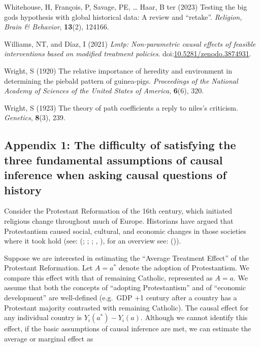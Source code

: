 \documentclass[
  singlecolumn,
  9pt]{article}
\begin{document}
\begin{CSLReferences}
Whitehouse, H, François, P, Savage, PE, \ldots{} Haar, B ter (2023)
Testing the big gods hypothesis with global historical data: A review
and {``}retake{''}. \emph{Religion, Brain \& Behavior}, \textbf{13}(2),
124166.

Williams, NT, and Díaz, I (2021) \emph{Lmtp: Non-parametric causal
effects of feasible interventions based on modified treatment policies}.
doi:\href{https://doi.org/10.5281/zenodo.3874931}{10.5281/zenodo.3874931}.

Wright, S (1920) The relative importance of heredity and environment in
determining the piebald pattern of guinea-pigs. \emph{Proceedings of the
National Academy of Sciences of the United States of America},
\textbf{6}(6), 320.

Wright, S (1923) The theory of path coefficients a reply to niles's
criticism. \emph{Genetics}, \textbf{8}(3), 239.

\end{CSLReferences}

\newpage{}

\subsection{Appendix 1: The difficulty of satisfying the three
fundamental assumptions of causal inference when asking causal questions
of
history}\label{appendix-1-the-difficulty-of-satisfying-the-three-fundamental-assumptions-of-causal-inference-when-asking-causal-questions-of-history}

Consider the Protestant Reformation of the 16th century, which initiated
religious change throughout much of Europe. Historians have argued that
Protestantism caused social, cultural, and economic changes in those
societies where it took hold (see: (; ;
; , ), for an overview see:
()).

Suppose we are interested in estimating the ``Average Treatment Effect''
of the Protestant Reformation. Let \(A = a^*\) denote the adoption of
Protestantism. We compare this effect with that of remaining Catholic,
represented as \(A = a\). We assume that both the concepts of ``adopting
Protestantism'' and of ``economic development'' are well-defined
(e.g.~GDP +1 century after a country has a Protestant majority
contrasted with remaining Catholic). The causal effect for any
individual country is \(Y_i(a^*) - Y_i(a)\). Although we cannot identify
this effect, if the basic assumptions of causal inference are met, we
can estimate the average or marginal effect as
\end{document}
